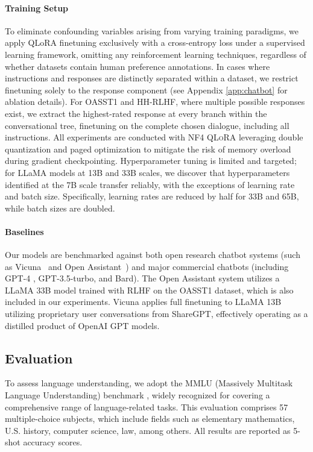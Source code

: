 \paragraph{Training Setup} To eliminate confounding variables arising from varying training paradigms, we apply QLoRA finetuning exclusively with a cross-entropy loss under a supervised learning framework, omitting any reinforcement learning techniques, regardless of whether datasets contain human preference annotations. In cases where instructions and responses are distinctly separated within a dataset, we restrict finetuning solely to the response component (see Appendix \ref{app:chatbot} for ablation details). For OASST1 and HH-RLHF, where multiple possible responses exist, we extract the highest-rated response at every branch within the conversational tree, finetuning on the complete chosen dialogue, including all instructions. All experiments are conducted with NF4 \textsc{QLoRA} leveraging double quantization and paged optimization to mitigate the risk of memory overload during gradient checkpointing. Hyperparameter tuning is limited and targeted; for LLaMA models at 13B and 33B scales, we discover that hyperparameters identified at the 7B scale transfer reliably, with the exceptions of learning rate and batch size. Specifically, learning rates are reduced by half for 33B and 65B, while batch sizes are doubled.

\paragraph{Baselines} Our models are benchmarked against both open research chatbot systems (such as Vicuna~\citep{vicuna2023} and Open Assistant~\citep{kopf2023openassistant}) and major commercial chatbots (including GPT-4 \citep{openai2023gpt}, GPT-3.5-turbo, and Bard). The Open Assistant system utilizes a LLaMA 33B model trained with RLHF on the OASST1 dataset, which is also included in our experiments. Vicuna applies full finetuning to LLaMA 13B utilizing proprietary user conversations from ShareGPT, effectively operating as a distilled product of OpenAI GPT models.

\subsection{Evaluation}

To assess language understanding, we adopt the MMLU (Massively Multitask Language Understanding) benchmark \citep{hendrycksmeasuring}, widely recognized for covering a comprehensive range of language-related tasks. This evaluation comprises 57 multiple-choice subjects, which include fields such as elementary mathematics, U.S. history, computer science, law, among others. All results are reported as 5-shot accuracy scores.

